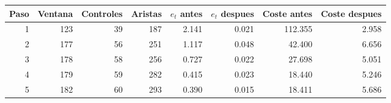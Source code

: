 \begin{tabular}{rrrrrrrr}
\hline
Paso & Ventana & Controles & Aristas & $e_t$ antes & $e_t$ despues & Coste antes & Coste despues \\
\hline
1 & 123 & 39 & 187 & 2.141 & 0.021 & 112.355 & 2.958 \\
2 & 177 & 56 & 251 & 1.117 & 0.048 & 42.400 & 6.656 \\
3 & 178 & 58 & 256 & 0.727 & 0.022 & 27.698 & 5.051 \\
4 & 179 & 59 & 282 & 0.415 & 0.023 & 18.440 & 5.246 \\
5 & 182 & 60 & 293 & 0.390 & 0.015 & 18.411 & 5.686 \\
\hline
\end{tabular}
